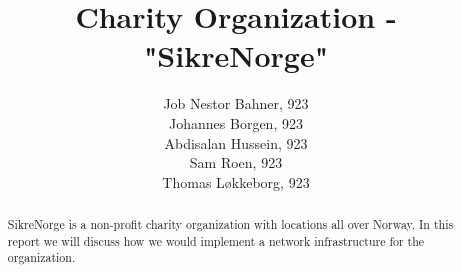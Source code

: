 
\newcommand{\notetous}[1] {
  \textbf{\textit{\textcolor{red}{#1}}}
}



\title{Charity Organization - "SikreNorge"}

\author{
  Job Nestor Bahner, 923\\
  Johannes Borgen, 923\\
  Abdisalan Hussein, 923\\
  Sam Roen, 923\\
  Thomas Løkkeborg, 923
}



\maketitle

\begin{abstract}
  SikreNorge is a non-profit charity organization with locations all over Norway. In this report we will discuss how we would implement a network infrastructure for the organization.
\end{abstract}

\thispagestyle{empty}

\clearpage
{}
\setcounter{page}{1}
\tableofcontents

\clearpage
{}


